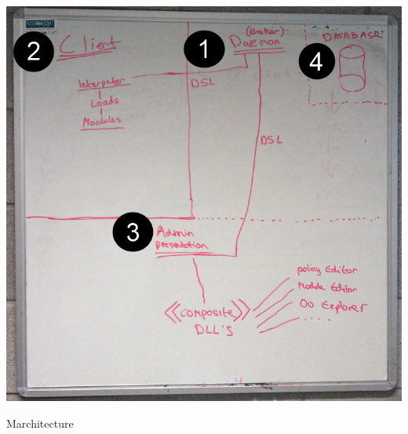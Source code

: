 	\vspace{3mm}
	\noindent\begin{minipage}{\textwidth}
			
		\begin{figurehere}
			\centering
			\includegraphics[scale=0.45]{pages/chapter3/figures/march2.png}
			\vspace{-2mm}
			\caption{Marchitecture}
			\label{fig:Marchiteture}
		\end{figurehere}	
	
	\end{minipage}	
		
